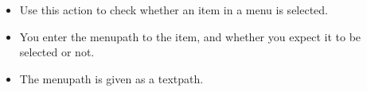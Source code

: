 
\begin{itemize}
\item Use this action to check whether an item in a menu is selected.
\item You enter the menupath to the item, and whether you expect it to be selected or not.
\item The menupath is given as a textpath. 
\end{itemize}
